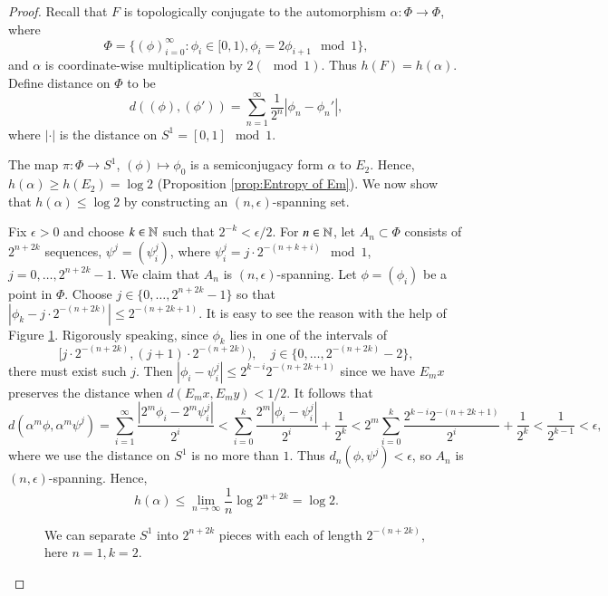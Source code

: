 \documentclass[12pt,a4paper]{article}
\begin{document}
	\begin{proof}
		Recall that $F$ is topologically conjugate to the automorphism $\alpha:\Phi\rightarrow \Phi$, where
		$$
		\Phi = \{(\phi)_{i=0}^{\infty}: \phi_i \in [0,1), \phi_i =2\phi_{i+1} \mod 1\},
		$$
		and $\alpha$ is coordinate-wise multiplication by $2 (\mod 1)$. Thus $h(F)=h(\alpha)$. Define distance on $\Phi$ to be
		$$
		d((\phi),(\phi'))=\sum_{n=1}^{\infty} \frac{1}{2^n} |\phi_n-\phi_n'|,
		$$
		where $|\cdot|$ is the distance on $S^1=[0,1]\mod 1$.
		
		The map $\pi:\Phi \rightarrow S^1$, $(\phi)\mapsto \phi_0$ is a semiconjugacy form $\alpha$ to $E_2$. Hence, $h(\alpha)\geq h(E_2)=\log 2$ (Proposition \ref{prop:Entropy of Em}). We now show that $h(\alpha)\leq \log 2$ by constructing an $(n,\epsilon)$-spanning set.
		
		Fix $\epsilon>0$ and choose $k\in \mathbb{N}$ such that $2^{-k}<\epsilon/2$. For $n\in\mathbb{N}$, let $A_n\subset \Phi$ consists of $2^{n+2k}$ sequences, $\psi^j = (\psi_i^j)$, where $\psi_i^j = j\cdot 2^{-(n+k+i)}\mod 1$, $j=0,\dots, 2^{n+2k}-1$. We claim that $A_n$ is $(n,\epsilon)$-spanning. Let $\phi=(\phi_i)$ be a point in $\Phi$. Choose $j\in \{0,\dots, 2^{n+2k}-1\}$ so that $|\phi_k-j\cdot 2^{-(n+2k)}|\leq 2^{-(n+2k+1)}$. It is easy to see the reason with the help of Figure \ref{fig:S1}. Rigorously speaking, since $\phi_k$ lies in one of the intervals of 
		$$
		[j\cdot 2^{-(n+2k)}, (j+1)\cdot 2^{-(n+2k)}),\quad j\in\{0,\dots, 2^{-(n+2k)}-2\},
		$$
		there must exist such $j$. Then $|\phi_i-\psi_i^j|\leq 2^{k-i}2^{-(n+2k+1)}$ since we have $E_mx$ preserves the distance when $d(E_m x, E_m y)<1/2$. It follows that 
		$$
		d(\alpha^m \phi,\alpha^m \psi^j) = \sum_{i=1}^\infty \frac{|2^m\phi_i - 2^m \psi_i^j|}{2^i}<\sum_{i=0}^k \frac{2^m |\phi_i-\psi_i^j|}{2^i}+\frac{1}{2^k}<2^m \sum_{i=0}^k \frac{2^{k-i}2^{-(n+2k+1)}}{2^i}+\frac{1}{2^k}<\frac{1}{2^{k-1}}<\epsilon,
		$$
		where we use the distance on $S^1$ is no more than $1$.		Thus $d_n(\phi,\psi^j)<\epsilon$, so $A_n$ is $(n,\epsilon)$-spanning. Hence,
		$$
		h(\alpha)\leq \lim_{n\to\infty} \frac{1}{n}\log 2^{n+2k}=\log 2.
		$$
				\begin{figure}
			\centering
			\caption{We can separate $S^1$ into $2^{n+2k}$ pieces with each of length $2^{-(n+2k)}$, here $n=1, k=2$.}\label{fig:S1}
		\end{figure}
	\end{proof}
\end{document}
